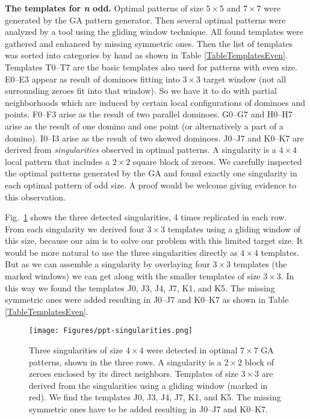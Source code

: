\documentclass[10pt,a4paper]{article}  %
\begin{document}
\textbf{The templates for \textit{n} odd.}
Optimal patterns of size $5 \times 5$ and   $7 \times 7$ were generated by the  GA pattern generator. 
Then several optimal patterns were analyzed by a tool using the gliding window technique.
All found templates were gathered and enhanced by missing symmetric ones.  
Then the list of templates was sorted into categories by hand as shown in Table \ref{TableTemplatesEven}.
Templates T0--T7 are the basic templates also used for patterns with even size. 
E0--E3 appear as result of dominoes fitting into  $3 \times 3$ target window (not all surrounding zeroes fit into that window). So we have it to do with partial neighborhoods which are induced by certain
local configurations of dominoes and points. 
F0--F3 arise as the result of two parallel dominoes. 
G0--G7 and H0--H7 arise as the result of one domino and one point (or alternatively a part of a domino).
I0--I3 arise as the result of two skewed dominoes.
J0--J7 and K0--K7 are derived from %
\textit{singularities} observed in optimal patterns.
A singularity is a $4 \times 4$ local pattern that includes a $2 \times 2$ square block of zeroes. 
We carefully inspected the optimal patterns generated by the GA and found exactly one singularity in each optimal pattern of odd size. 
A proof would be welcome giving evidence to this observation. 

Fig.~\ref{ppt-singularities} shows the three detected singularities, 4 times replicated in each row.
From each singularity we derived  four $3 \times 3$ templates using a gliding window of this size,
because our aim is to solve our problem with this limited target size.
It would be more natural to use the three singularities directly as $4 \times 4$ templates.
But as we can assemble a singularity by overlaying four $3 \times 3$ templates (the marked windows)
we can get along with the smaller templates of size $3 \times 3$.  
In this way we found the templates J0, J3, J4, J7, K1, and K5. The missing symmetric ones were added
resulting in J0--J7 and K0--K7 as shown in Table \ref{TableTemplatesEven}.



\begin{figure}[H] 
\centering

\texttt{[image: Figures/ppt-singularities.png]}

\caption{
Three singularities of size $4 \times 4$ were detected in optimal $7 \times 7$ GA patterns,
shown in the three rows. 
A singularity is a $2 \times 2$ block of zeroes enclosed by its direct neighbors.
Templates of size $3 \times 3$ are derived from the singularities using a gliding window (marked in red).
We find the templates J0, J3, J4, J7, K1, and K5. The missing symmetric ones have to be added
resulting in J0--J7 and K0--K7.
}
\label{ppt-singularities}
\end{figure}
\end{document}
